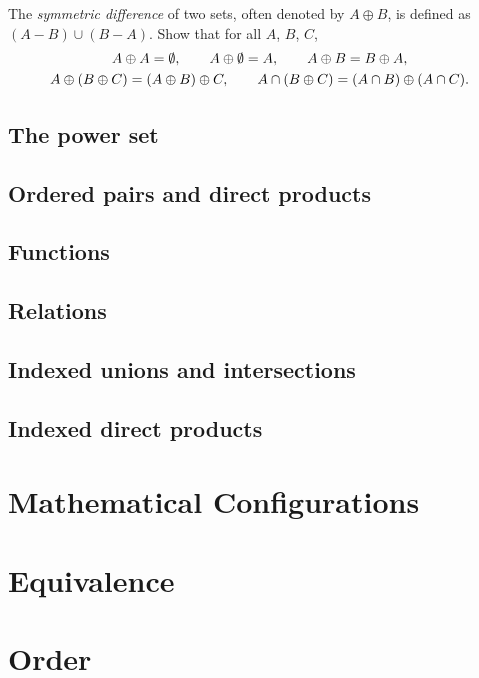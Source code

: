 \documentclass{report}
\begin{document}
\begin{solution}

\end{solution}

\begin{exercise}
The \textit{symmetric difference} of two sets, often denoted by $A\oplus B$, is defined
as $(A-B)\cup(B-A)$. Show that for all $A$, $B$, $C$,
\begin{gather*}
    A\oplus A=\emptyset, \qquad A\oplus\emptyset = A, \qquad A\oplus B = B\oplus A,\\
    A\oplus(B\oplus C) = (A\oplus B)\oplus C, \qquad A\cap(B\oplus C)=(A\cap B)\oplus(A\cap C).
\end{gather*}
\end{exercise}

\begin{solution}
\end{solution}

\section{The power set }
\section{Ordered pairs and direct products}
\section{Functions}
\section{Relations}
\section{Indexed unions and intersections}
\section{Indexed direct products}


\chapter{Mathematical Configurations}
\chapter{Equivalence}
\chapter{Order}
\end{document}
